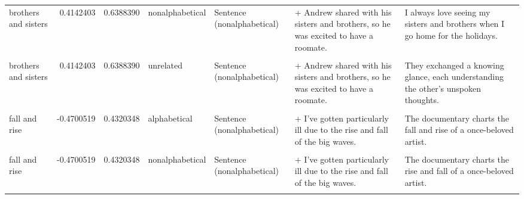 \documentclass[
  12pt,
]{scrartcl}
\begin{document}
\begin{landscape}
\begin{longtable}{lrrllll}
brothers and sisters & 0.4142403 & 0.6388390 & nonalphabetical & Sentence (nonalphabetical) & + Andrew shared with his sisters and brothers, so he was excited to have a roomate. & I always love seeing my sisters and brothers when I go home for the holidays.\\
\addlinespace
\cellcolor{gray!6}{brothers and sisters} & \cellcolor{gray!6}{0.4142403} & \cellcolor{gray!6}{0.6388390} & \cellcolor{gray!6}{unrelated} & \cellcolor{gray!6}{Sentence (alphabetical)} & \cellcolor{gray!6}{+ Andrew shared with his brothers and sisters, so he was excited to have a roomate.} & \cellcolor{gray!6}{They exchanged a knowing glance, each understanding the other's unspoken thoughts.}\\
brothers and sisters & 0.4142403 & 0.6388390 & unrelated & Sentence (nonalphabetical) & + Andrew shared with his sisters and brothers, so he was excited to have a roomate. & They exchanged a knowing glance, each understanding the other's unspoken thoughts.\\
\cellcolor{gray!6}{fall and rise} & \cellcolor{gray!6}{-0.4700519} & \cellcolor{gray!6}{0.4320348} & \cellcolor{gray!6}{alphabetical} & \cellcolor{gray!6}{Sentence (alphabetical)} & \cellcolor{gray!6}{+ I've gotten particularly ill due to the fall and rise of the big waves.} & \cellcolor{gray!6}{The documentary charts the fall and rise of a once-beloved artist.}\\
fall and rise & -0.4700519 & 0.4320348 & alphabetical & Sentence (nonalphabetical) & + I've gotten particularly ill due to the rise and fall of the big waves. & The documentary charts the fall and rise of a once-beloved artist.\\
\cellcolor{gray!6}{fall and rise} & \cellcolor{gray!6}{-0.4700519} & \cellcolor{gray!6}{0.4320348} & \cellcolor{gray!6}{nonalphabetical} & \cellcolor{gray!6}{Sentence (alphabetical)} & \cellcolor{gray!6}{+ I've gotten particularly ill due to the fall and rise of the big waves.} & \cellcolor{gray!6}{The documentary charts the rise and fall of a once-beloved artist.}\\
\addlinespace
fall and rise & -0.4700519 & 0.4320348 & nonalphabetical & Sentence (nonalphabetical) & + I've gotten particularly ill due to the rise and fall of the big waves. & The documentary charts the rise and fall of a once-beloved artist.\\
\cellcolor{gray!6}{fall and rise} & \cellcolor{gray!6}{-0.4700519} & \cellcolor{gray!6}{0.4320348} & \cellcolor{gray!6}{unrelated} & \cellcolor{gray!6}{Sentence (alphabetical)} & \cellcolor{gray!6}{+ I've gotten particularly ill due to the fall and rise of the big waves.} & \cellcolor{gray!6}{She gazed out at the ocean, mesmerized by the endless waves crashing against the shore.}\\

\end{longtable}
\end{landscape}
\end{document}
